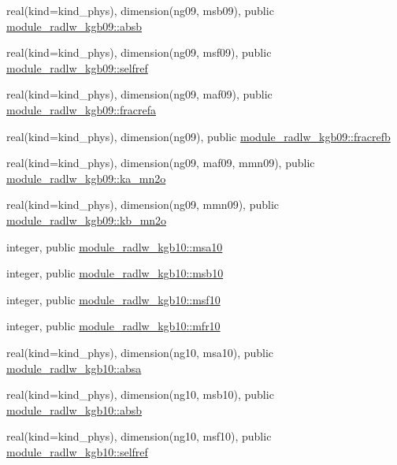 \begin{DoxyCompactItemize}
real(kind=kind\+\_\+phys), dimension(ng09, msb09), public \hyperlink{group__module__radlw__main_gadb2110a245d9f01b3fd1ab058c883003}{module\+\_\+radlw\+\_\+kgb09\+::absb}
\item 
real(kind=kind\+\_\+phys), dimension(ng09, msf09), public \hyperlink{group__module__radlw__main_ga1c65e91a215060738292d0ca5a8f38a2}{module\+\_\+radlw\+\_\+kgb09\+::selfref}
\item 
real(kind=kind\+\_\+phys), dimension(ng09, maf09), public \hyperlink{group__module__radlw__main_gace3d3e2731609f7ea50eb798bd212f3b}{module\+\_\+radlw\+\_\+kgb09\+::fracrefa}
\item 
real(kind=kind\+\_\+phys), dimension(ng09), public \hyperlink{group__module__radlw__main_ga26476f00fe13c1c81d3ae0cf8e43c90b}{module\+\_\+radlw\+\_\+kgb09\+::fracrefb}
\item 
real(kind=kind\+\_\+phys), dimension(ng09, maf09, mmn09), public \hyperlink{group__module__radlw__main_ga37d98e8066c5995060a2a8451b45705f}{module\+\_\+radlw\+\_\+kgb09\+::ka\+\_\+mn2o}
\item 
real(kind=kind\+\_\+phys), dimension(ng09, mmn09), public \hyperlink{group__module__radlw__main_ga79326139db789012d47c4750917c2cdb}{module\+\_\+radlw\+\_\+kgb09\+::kb\+\_\+mn2o}
\item 
integer, public \hyperlink{namespacemodule__radlw__kgb10_a2305b922082d1cc367276b636f09fb6c}{module\+\_\+radlw\+\_\+kgb10\+::msa10}
\item 
integer, public \hyperlink{group__module__radlw__main_gaf33570d793ca152588c14ce30ac30798}{module\+\_\+radlw\+\_\+kgb10\+::msb10}
\item 
integer, public \hyperlink{group__module__radlw__main_ga1b69c6fe99ed4ebc7b3d78b8f842b880}{module\+\_\+radlw\+\_\+kgb10\+::msf10}
\item 
integer, public \hyperlink{group__module__radlw__main_ga0f3944c4b86044e0c5db3dc351226c88}{module\+\_\+radlw\+\_\+kgb10\+::mfr10}
\item 
real(kind=kind\+\_\+phys), dimension(ng10, msa10), public \hyperlink{group__module__radlw__main_ga14f18538f77c1a3d651e36acf90baa19}{module\+\_\+radlw\+\_\+kgb10\+::absa}
\item 
real(kind=kind\+\_\+phys), dimension(ng10, msb10), public \hyperlink{group__module__radlw__main_gaf1e2252355a3002080be21ce37d45c3a}{module\+\_\+radlw\+\_\+kgb10\+::absb}
\item 
real(kind=kind\+\_\+phys), dimension(ng10, msf10), public \hyperlink{group__module__radlw__main_ga48247dea283a611ebe57dd1c164dda69}{module\+\_\+radlw\+\_\+kgb10\+::selfref}

\end{DoxyCompactItemize}
